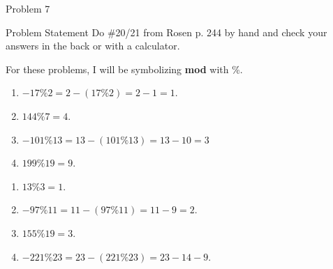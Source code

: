 \begin{problem}{Problem 7}
    \begin{statement}{Problem Statement}
        Do \#20/21 from Rosen p. 244 by hand and check your answers in the back or with a calculator.
    \end{statement}

    For these problems, I will be symbolizing \textbf{mod} with \%.

    \begin{highlight}[Solution \#20]
        \begin{enumerate}[label = (\alph*)]
            \item $-17 \% 2 = 2 - (17 \% 2) = 2 - 1 = 1.$
            \item $144 \% 7 = 4.$
            \item $-101 \% 13 = 13 - (101 \% 13) = 13 - 10 = 3$
            \item $199 \% 19 = 9.$
        \end{enumerate}
    \end{highlight}

    \begin{highlight}[Solution \#21]
        \begin{enumerate}[label = (\alph*)]
            \item $13 \% 3 = 1.$
            \item $-97 \% 11 = 11 - (97 \% 11) = 11 - 9 = 2.$
            \item $155 \% 19 = 3.$
            \item $-221 \% 23 = 23 - (221 \% 23) = 23 - 14 - 9.$
        \end{enumerate}
    \end{highlight}
\end{problem}

